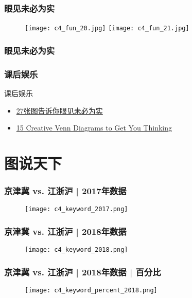 \begin{frame}
  \frametitle{眼见未必为实}
  \begin{figure}
    \centering
    \texttt{[image: c4\_fun\_20.jpg]}\quad
    \texttt{[image: c4\_fun\_21.jpg]}
  \end{figure}
\end{frame}

\begin{frame}
  \frametitle{眼见未必为实}
  \begin{figure}
    \centering
    \quad
  \end{figure}
\end{frame}

\begin{frame}
  \frametitle{课后娱乐}
  \begin{block}{课后娱乐}
    \begin{itemize}
      \item \href{http://www.guancha.cn/Celebrity/2014_11_04_282826.shtml}{27张图告诉你眼见未必为实}
      \item \href{http://creately.com/blog/diagrams/creative-venn-diagrams/}{15 Creative Venn Diagrams to Get You Thinking}
    \end{itemize}
  \end{block}
\end{frame}

\section{图说天下}
\begin{frame}
  \frametitle{京津冀 vs. 江浙沪 | 2017年数据}
  \begin{figure}
    \centering
    \texttt{[image: c4\_keyword\_2017.png]}
  \end{figure}
\end{frame}

\begin{frame}
  \frametitle{京津冀 vs. 江浙沪 | 2018年数据}
  \begin{figure}
    \centering
    \texttt{[image: c4\_keyword\_2018.png]}
  \end{figure}
\end{frame}

\begin{frame}
  \frametitle{京津冀 vs. 江浙沪 | 2018年数据 | 百分比}
  \begin{figure}
    \centering
    \texttt{[image: c4\_keyword\_percent\_2018.png]}
  \end{figure}
\end{frame}

